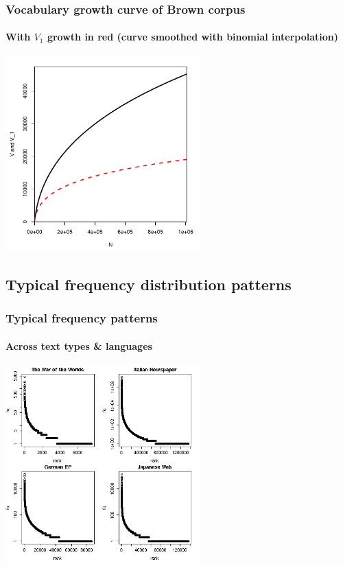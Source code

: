 \documentclass[t]{beamer} %
\begin{document}
\begin{frame}
  \frametitle{Vocabulary growth curve of Brown corpus}
  \framesubtitle{With $V_1$ growth in red (curve smoothed with binomial interpolation)}

  \ungap[1.5]
  \begin{center}
    \includegraphics[height=7.5cm]{img/brown-vgc}
  \end{center}
\end{frame}

\subsection{Typical frequency distribution patterns}

\begin{frame}
  \frametitle{Typical frequency patterns} 
  \framesubtitle{Across text types \& languages}

  \ungap[1.5]
  \begin{center}
    \includegraphics[height=7.5cm]{img/othercorporarf}
  \end{center}
\end{frame}
\end{document}
